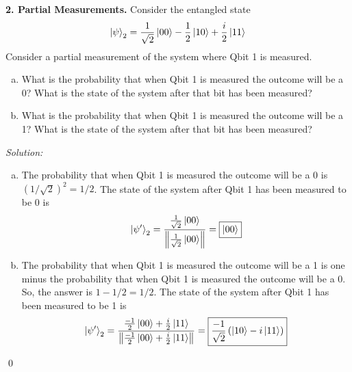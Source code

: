\documentclass{book}
\theoremstyle{definition}
\newcommand{\f}[2]{\frac{#1}{#2}}
\newcommand{\lp}{\left(}
\newcommand{\rp}{\right)}
\begin{document}
\noindent \textbf{2. Partial Measurements.} Consider the entangled state
\begin{align}
\ket{\psi}_2 = \f{1}{\sqrt{2}}\ket{00} - \f{1}{{2}}\ket{10} + \f{i}{2}\ket{11}
\end{align}
Consider a partial measurement of the system where Qbit 1 is measured.
\begin{enumerate}[(a)]
	\item What is the probability that when Qbit 1 is measured the outcome will be a 0? What
	is the state of the system after that bit has been measured?

	\item What is the probability that when Qbit 1 is measured the outcome will be a 1? What
	is the state of the system after that bit has been measured?
\end{enumerate}








\noindent \textit{Solution:} 
\begin{enumerate}[(a)]
	\item The probability that when Qbit 1 is measured the outcome will be a 0 is $(1/\sqrt{2})^2 = \boxed{1/2}$. The state of the system after Qbit 1 has been measured to be 0 is 
	\begin{align}
	\ket{\psi'}_2 = \f{\f{1}{\sqrt{2}}\ket{00}  }{\norm{\f{1}{\sqrt{2}}\ket{00} }} = \boxed{\ket{00}}
	\end{align}
	\item  The probability that when Qbit 1 is measured the outcome will be a 1 is one minus the probability that when Qbit 1 is measured the outcome will be a 0. So, the answer is $1 - 1/2 = \boxed{1/2}$. The state of the system after Qbit 1 has been measured to be 1 is
	\begin{align}
	\ket{\psi'}_2 = \f{\f{-1}{2}\ket{00}+ \f{i}{2}\ket{11}   }{\norm{\f{-1}{2}\ket{00}+ \f{i}{2}\ket{11} }} = \boxed{\f{-1}{\sqrt{2}}\lp \ket{10} - i\ket{11} \rp}
	\end{align} 
\end{enumerate}\qed
\end{document}
